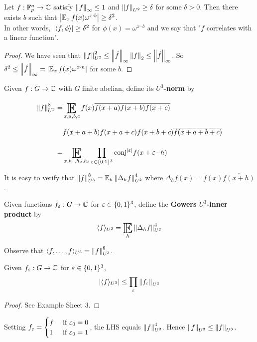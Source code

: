 \documentclass{article}
\begin{document}
\begin{thm}
  Let $f : \mathbb F_p^n \to \mathbb C$ satisfy $\left\lVert f\right\rVert_\infty \le 1$ and $\left\lVert f\right\rVert_{U^2} \ge \delta$ for some $\delta > 0$. Then there exists $b$ such that $\abs{\E_x f(x) \omega^{x \cdot b}} \ge \delta^2$. \\
  In other words, $\left\lvert \left\langle f, \phi\right\rangle\right\rvert \ge \delta^2$ for $\phi(x) = \omega^{x \cdot b}$ and we say that "$f$ correlates with a linear function".
\end{thm}
\begin{proof}
  We have seen that $\left\lVert f\right\rVert_{U^2}^2 \le \left\lVert \hat f\right\rVert_\infty \left\lVert f\right\rVert_2 \le \left\lVert \hat f\right\rVert_\infty$. So $\delta^2 \le \norm{\hat f}_\infty = \abs{\E_x f(x) \omega^{x \cdot n}}$ for some $b$.
\end{proof}

\begin{dfn}
  Given $f : G \to \mathbb C$ with $G$ finite abelian, define its {\bf $U^3$-norm} by
  \begin{align*}
    \norm f_{U^3}^8
    = & \E_{x, a, b, c} f(x) \overline{f(x + a) f(x + b) f(x + c)} \\
    & f(x + a + b) f(x + a + c) f(x + b + c) \overline{f(x + a + b + c)} \\
    = & \E_{x, h_1, h_2, h_3} \prod_{\eps \in \{0, 1\}^3} \mathrm{conj}^{\abs\eps} f(x + \eps \cdot h)
  \end{align*}
\end{dfn}

It is easy to verify that $\norm f_{U^3}^8 = \E_h \norm{\Delta_h f}_{U^2}^4$ where $\Delta_h f(x) = f(x) \overline{f(x + h)}$.

\begin{dfn}
  Given functions $f_\varepsilon : G \to \mathbb C$ for $\varepsilon \in \{0, 1\}^3$, define the {\bf Gowers $U^3$-inner product} by
  $$\langle f\rangle_{U^3} = \E_h \norm{\Delta_h f}_{U^2}^4$$
\end{dfn}

Observe that $\langle f, \dots, f\rangle_{U^3} = \left\lVert f\right\rVert_{U^3}^8$.

\begin{lem}
  Given $f_\varepsilon : G \to \mathbb C$ for $\varepsilon \in \{0, 1\}^3$,
  $$\left\lvert \langle f\rangle_{U^3}\right\rvert \le \prod_\varepsilon \left\lVert f_\varepsilon\right\rVert_{U^3}$$
\end{lem}
\begin{proof}
  See Example Sheet 3.
\end{proof}

Setting $f_\varepsilon = \begin{cases}
  f & \text{ if } \varepsilon_0 = 0 \\
  1 & \text{ if } \varepsilon_0 = 1
\end{cases}$, the LHS equals $\left\lVert f\right\rVert_{U^2}^4$. Hence $\left\lVert f\right\rVert_{U^2} \le \left\lVert f\right\rVert_{U^3}$.
\end{document}
